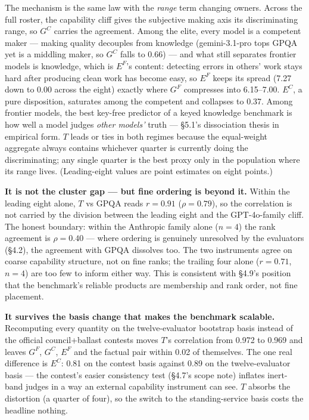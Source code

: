 The mechanism is the same law with the \emph{range} term changing owners. Across the full roster, the capability cliff gives the subjective making axis its discriminating range, so \(G^{C}\) carries the agreement. Among the elite, every model is a competent maker --- making quality decouples from knowledge (gemini-3.1-pro tops GPQA yet is a middling maker, so \(G^{C}\) falls to 0.66) --- and what still separates frontier models is knowledge, which is \(E^{F}\)'s content: detecting errors in others' work stays hard after producing clean work has become easy, so \(E^{F}\) keeps its spread (7.27 down to 0.00 across the eight) exactly where \(G^{F}\) compresses into 6.15--7.00. \(E^{C}\), a pure disposition, saturates among the competent and collapses to 0.37. Among frontier models, the best key-free predictor of a keyed knowledge benchmark is how well a model judges \emph{other models'} truth --- §5.1's dissociation thesis in empirical form. \(T\) leads or ties in both regimes because the equal-weight aggregate always contains whichever quarter is currently doing the discriminating; any single quarter is the best proxy only in the population where its range lives. (Leading-eight values are point estimates on eight points.)

\textbf{It is not the cluster gap --- but fine ordering is beyond it.} Within the leading eight alone, \(T\) vs GPQA reads \(r = 0.91\) (\(\rho = 0.79\)), so the correlation is not carried by the division between the leading eight and the GPT-4o-family cliff. The honest boundary: within the Anthropic family alone (\(n = 4\)) the rank agreement is \(\rho = 0.40\) --- where ordering is genuinely unresolved by the evaluators (§4.2), the agreement with GPQA dissolves too. The two instruments agree on coarse capability structure, not on fine ranks; the trailing four alone (\(r = 0.71\), \(n = 4\)) are too few to inform either way. This is consistent with §4.9's position that the benchmark's reliable products are membership and rank order, not fine placement.

\textbf{It survives the basis change that makes the benchmark scalable.} Recomputing every quantity on the twelve-evaluator bootstrap basis instead of the official council+ballast contests moves \(T\)'s correlation from 0.972 to 0.969 and leaves \(G^{F}\), \(G^{C}\), \(E^{F}\) and the factual pair within 0.02 of themselves. The one real difference is \(E^{C}\): 0.81 on the contest basis against 0.89 on the twelve-evaluator basis --- the contest's easier consistency test (§4.7's scope note) inflates inert-band judges in a way an external capability instrument can see. \(T\) absorbs the distortion (a quarter of four), so the switch to the standing-service basis costs the headline nothing.

